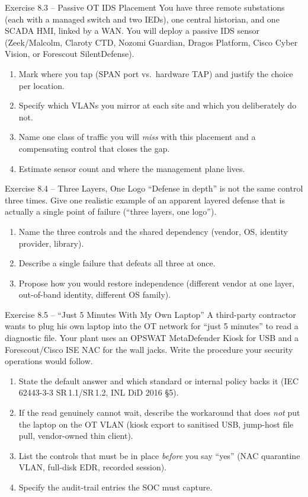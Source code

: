\documentclass[11pt,a4paper]{article}
\begin{document}
\begin{taskbox}{Exercise 8.3 -- Passive OT IDS Placement}
You have three remote substations (each with a managed switch and two IEDs), one central historian, and one SCADA HMI, linked by a WAN. You will deploy a passive IDS sensor (Zeek/Malcolm, Claroty CTD, Nozomi Guardian, Dragos Platform, Cisco Cyber Vision, or Forescout SilentDefense).
\begin{enumerate}\setlength{\itemsep}{1pt}
  \item Mark where you tap (SPAN port vs.\ hardware TAP) and justify the choice per location.
  \item Specify which VLANs you mirror at each site and which you deliberately do not.
  \item Name one class of traffic you will \emph{miss} with this placement and a compensating control that closes the gap.
  \item Estimate sensor count and where the management plane lives.
\end{enumerate}
\end{taskbox}

\begin{taskbox}{Exercise 8.4 -- Three Layers, One Logo}
``Defense in depth'' is not the same control three times. Give one realistic example of an apparent layered defense that is actually a single point of failure (``three layers, one logo'').
\begin{enumerate}\setlength{\itemsep}{1pt}
  \item Name the three controls and the shared dependency (vendor, OS, identity provider, library).
  \item Describe a single failure that defeats all three at once.
  \item Propose how you would restore independence (different vendor at one layer, out-of-band identity, different OS family).
\end{enumerate}
\end{taskbox}

\begin{taskbox}{Exercise 8.5 -- ``Just 5 Minutes With My Own Laptop''}
A third-party contractor wants to plug his own laptop into the OT network for ``just 5 minutes'' to read a diagnostic file. Your plant uses an OPSWAT MetaDefender Kiosk for USB and a Forescout/Cisco ISE NAC for the wall jacks. Write the procedure your security operations would follow.
\begin{enumerate}\setlength{\itemsep}{1pt}
  \item State the default answer and which standard or internal policy backs it (IEC 62443-3-3 SR\,1.1/SR\,1.2, INL DiD 2016 \S 5).
  \item If the read genuinely cannot wait, describe the workaround that does \emph{not} put the laptop on the OT VLAN (kiosk export to sanitised USB, jump-host file pull, vendor-owned thin client).
  \item List the controls that must be in place \emph{before} you say ``yes'' (NAC quarantine VLAN, full-disk EDR, recorded session).
  \item Specify the audit-trail entries the SOC must capture.
\end{enumerate}
\end{taskbox}
\end{document}

